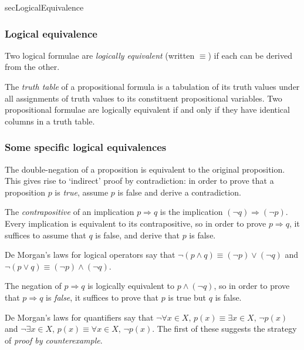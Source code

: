 \begin{tldr}{secLogicalEquivalence}
\subsubsection*{Logical equivalence}

\begin{tldrlist}
Two logical formulae are \textit{logically equivalent} (written $\equiv$) if each can be derived from the other.

The \textit{truth table} of a propositional formula is a tabulation of its truth values under all assignments of truth values to its constituent propositional variables. Two propositional formulae are logically equivalent if and only if they have identical columns in a truth table.
\end{tldrlist}

\subsubsection*{Some specific logical equivalences}

\begin{tldrlist}
The double-negation of a proposition is equivalent to the original proposition. This gives rise to `indirect' proof by contradiction: in order to prove that a proposition $p$ is \textit{true}, assume $p$ is false and derive a contradiction.

The \textit{contrapositive} of an implication $p \Rightarrow q$ is the implication $(\neg q) \Rightarrow (\neg p)$. Every implication is equivalent to its contrapositive, so in order to prove $p \Rightarrow q$, it suffices to assume that $q$ is false, and derive that $p$ is false.

De Morgan's laws for logical operators say that $\neg (p \wedge q) \equiv (\neg p) \vee (\neg q)$ and $\neg (p \vee q) \equiv (\neg p) \wedge (\neg q)$.

The negation of $p \Rightarrow q$ is logically equivalent to $p \wedge (\neg q)$, so in order to prove that $p \Rightarrow q$ is \textit{false}, it suffices to prove that $p$ is true but $q$ is false.

De Morgan's laws for quantifiers say that $\neg \forall x \in X,\, p(x) \equiv \exists x \in X,\, \neg p(x)$ and $\neg \exists x \in X,\, p(x) \equiv \forall x \in X,\, \neg p(x)$. The first of these suggests the strategy of \textit{proof by counterexample}.
\end{tldrlist}


\end{tldr}
